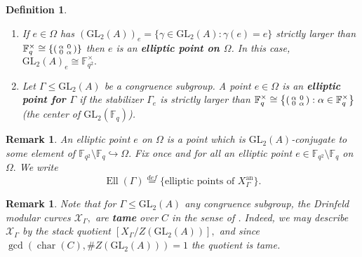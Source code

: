 \documentclass[11pt]{amsart}
\newtheorem{definition}[theorem]{Definition}
\newtheorem{remark}[theorem]{Remark}
\theoremstyle{definition}
\newenvironment{psmallmatrix}
{\left(\begin{smallmatrix}}
	{\end{smallmatrix}\right)}
\numberwithin{equation}{section}
\newcommand{\GL}{\mathrm{GL}} 	%
\newcommand{\sX}{\mathscr{X}}		%
\newcommand{\bbF}{\mathbb{F}}		%
\begin{document}
		\begin{definition}\label{d: elliptic pt}
			$~$
			\begin{enumerate}
				\item	If $e\in \Omega$ has $(\GL_2(A))_e=\{\gamma\in \GL_2(A):\gamma(e)=e\}$ strictly larger than $\bbF_q^{\times}\cong \left\{\begin{psmallmatrix}\alpha&0\\0&\alpha\end{psmallmatrix}\right\}$ then $e$ is an \textbf{elliptic point on $\Omega$}. In this case, $\GL_2(A)_e\cong \bbF_{q^2}^{\times}.$\\
				
				\item	Let $\Gamma\leq \GL_2(A)$ be a congruence subgroup. A point $e\in \Omega$ is an \textbf{elliptic point for $\Gamma$} if the stabilizer $\Gamma_e$ is strictly larger than $\displaystyle{\bbF_q^{\times}\cong\left\{\begin{psmallmatrix}\alpha&0\\0&\alpha\end{psmallmatrix}:\alpha\in \bbF_q^{\times}\right\}}$ (the center of $\GL_2(\bbF_q)$). 
			\end{enumerate}
		\end{definition}
		
		\begin{remark}\label{remark: unique elliptic point for Omega}
			An elliptic point $e$ on $\Omega$ is a point which is $\GL_2(A)$-conjugate to some element of $\bbF_{q^2}\setminus\bbF_q\hookrightarrow \Omega.$ Fix once and for all an elliptic point $e\in \bbF_{q^2}\setminus\bbF_q$ on $\Omega.$ 
			We write
			\[\operatorname{Ell}(\Gamma)\overset{def}{=}\{\text{elliptic points of }X_{\Gamma}^{\text{an}}\}.\]
		\end{remark}
		
		\begin{remark}\label{remark: tameness of Drinfeld modular curves}
			Note that for $\Gamma\leq \GL_2(A)$ any congruence subgroup, the Drinfeld modular curves $\sX_{\Gamma},$ are \textbf{tame} over $C$ in the sense of \cite[Example $5.2.7$]{VZB}. Indeed, we may describe $\sX_{\Gamma}$ by the stack quotient $[X_{\Gamma}/Z(\GL_2(A))],$ and since $\gcd(\operatorname{char}(C),\#Z(\GL_2(A)))=1$ the quotient is tame. 
		\end{remark}
		
\end{document}
